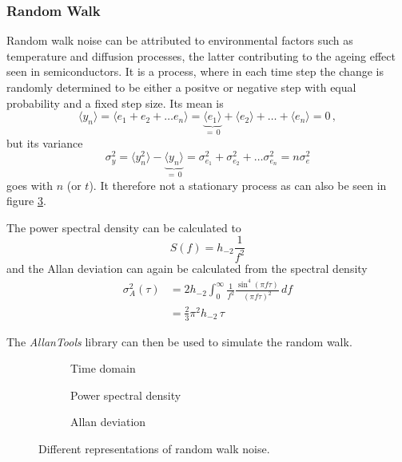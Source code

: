 \clearpage
\subsubsection{Random Walk}
Random walk noise can be attributed to environmental factors such as temperature \cite{random_walk_fm} and diffusion processes, the latter contributing to the ageing effect seen in semiconductors.
It is a process, where in each time step the change is randomly determined to be either a positve or negative step with equal probability and a fixed step size. Its mean is
\begin{equation}
    \langle y_n \rangle = \langle e_1 + e_2 + \dots e_n \rangle = \underbrace{\langle e_1 \rangle}_{=\,0} + \langle e_2 \rangle + \dots + \langle e_n \rangle = 0 \, ,
\end{equation}
but its variance
\begin{equation}
    \sigma_y^2 = \langle y_n^2 \rangle - \underbrace{\langle y_n \rangle}_{=\,0} = \sigma_{e_1}^2 + \sigma_{e_2}^2 + \dots \sigma_{e_n}^2 = n \sigma_e^2
\end{equation}
goes with $n$ (or $t$). It therefore not a stationary process as can also be seen in figure \ref{fig:random_walk_adev}.

The power spectral density can be calculated \cite{psd_to_adev,noise_generation} to
\begin{equation}
    S(f) = h_{-2} \frac{1}{f^2}
\end{equation}
and the Allan deviation can again be calculated from the spectral density
\begin{align}
    \sigma_A^2(\tau) &= 2 h_{-2} \int_0^\infty \frac{1}{f^2} \frac{\sin^4\left( \pi f \tau \right)}{(\pi f \tau)^2}\,df \nonumber\\
    &=\frac{2}{3} \pi^2 h_{-2}\, \tau
\end{align}

The \textit{AllanTools} library \cite{allantools} can then be used to simulate the random walk.

\begin{figure}[ht]
    \centering
    \begin{subfigure}{0.32\linewidth}
        \centering
        \scalebox{0.75}{%
            
        } %
        \caption{Time domain}
        \label{fig:random_walk_time}
    \end{subfigure}
    \begin{subfigure}{0.32\linewidth}
        \centering
        \scalebox{0.75}{%
            
        } %
        \caption{Power spectral density}
        \label{fig:random_walk_psd}
    \end{subfigure}
    \begin{subfigure}{0.32\linewidth}
        \centering
        \scalebox{0.75}{%
            
        } %
        \caption{Allan deviation}
        \label{fig:random_walk_adev}
    \end{subfigure}
    \caption{Different representations of random walk noise.}
    \label{fig:random_walk_noise_simulated}
\end{figure}



